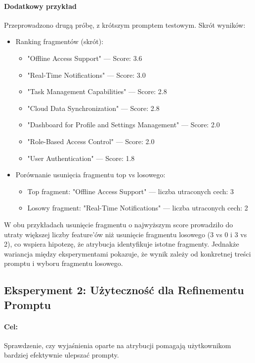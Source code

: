 \documentclass[12pt,a4paper]{article}
\begin{document}
\paragraph{Dodatkowy przykład}
Przeprowadzono drugą próbę, z krótszym promptem testowym. Skrót wyników:
\begin{itemize}
    \item Ranking fragmentów (skrót):
    \begin{itemize}
        \item "Offline Access Support" — Score: 3.6
        \item "Real-Time Notifications" — Score: 3.0
        \item "Task Management Capabilities" — Score: 2.8
        \item "Cloud Data Synchronization" — Score: 2.8
        \item "Dashboard for Profile and Settings Management" — Score: 2.0
        \item "Role-Based Access Control" — Score: 2.0
        \item "User Authentication" — Score: 1.8
    \end{itemize}
    \item Porównanie usunięcia fragmentu top vs losowego:
    \begin{itemize}
        \item Top fragment: "Offline Access Support" — liczba utraconych cech: 3
        \item Losowy fragment: "Real-Time Notifications" — liczba utraconych cech: 2
    \end{itemize}
\end{itemize}

W obu przykładach usunięcie fragmentu o najwyższym score prowadziło do utraty większej liczby feature'ów niż usunięcie fragmentu losowego (3 vs 0 i 3 vs 2), co wspiera hipotezę, że atrybucja identyfikuje istotne fragmenty. Jednakże wariancja między eksperymentami pokazuje, że wynik zależy od konkretnej treści promptu i wyboru fragmentu losowego.

\subsection{Eksperyment 2: Użyteczność dla Refinementu Promptu}

\paragraph{Cel:} Sprawdzenie, czy wyjaśnienia oparte na atrybucji pomagają użytkownikom bardziej efektywnie ulepszać prompty.
\end{document}
